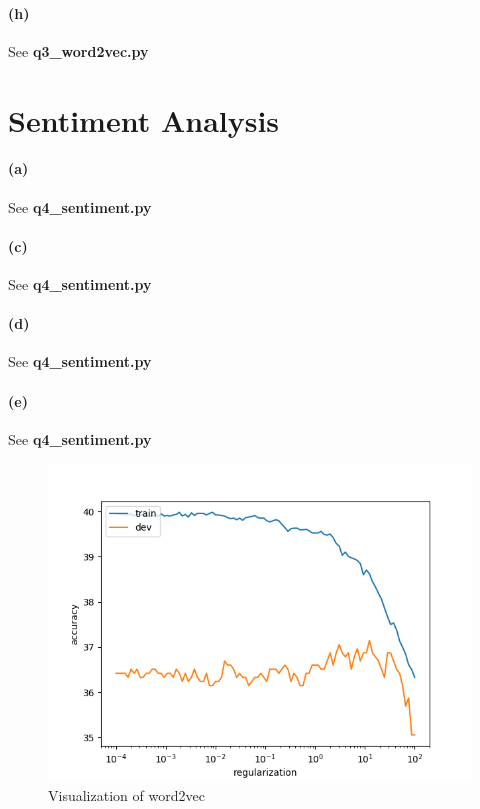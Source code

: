 \documentclass{article}
\begin{document}
\begin{spacing}{1.5}
\paragraph{(h)}See \textbf{q3\_word2vec.py}

\section{Sentiment Analysis}
\paragraph{(a)}See \textbf{q4\_sentiment.py}
\paragraph{(c)}See \textbf{q4\_sentiment.py}
\paragraph{(d)}See \textbf{q4\_sentiment.py}
\paragraph{(e)}See \textbf{q4\_sentiment.py}
\begin{figure}
  \centering
  \includegraphics[width=\textwidth]{q4_reg_v_acc}
  \caption{Visualization of word2vec}\label{fig:2} 
\end{figure}


\end{spacing}
\end{document}
